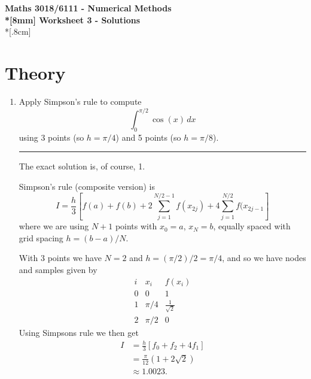 \documentclass[10pt]{article}
\begin{document}
\thispagestyle{empty}
\begin{center}
\textbf{\Large Maths 3018/6111 - Numerical Methods \\*[8mm]
Worksheet 3 - Solutions}\\*[.8cm]
\end{center}

\section*{Theory}

\begin{enumerate}
\item Apply Simpson's rule to compute
  \begin{equation*}
    \int_0^{\pi/2} \cos(x) \, dx
  \end{equation*}
  using 3 points (so $h = \pi / 4$) and 5 points (so $h = \pi / 8$).
  \begin{center}
    \rule{0.9\textwidth}{.1pt}
  \end{center}
  The exact solution is, of course, 1.

  Simpson's rule (composite version) is
  \begin{equation*}
    I = \frac{h}{3} \left[ f(a) + f(b) + 2 \sum_{j=1}^{N/2-1}
      f(x_{2j}) + 4 \sum_{j=1}^{N/2}  f(x_{2j-1} \right]
  \end{equation*}
  where we are using $N+1$ points with $x_0=a$, $x_N=b$, equally
  spaced with grid spacing $h = (b-a)/N$.

  With 3 points we have $N=2$ and $h=(\pi/2)/2=\pi/4$, and so we have
  nodes and samples given by
  \begin{equation*}
    \begin{array}{c|c|c}
      i & x_i & f(x_i) \\ \hline
      0 & 0 & 1 \\
      1 & \pi/4 & \tfrac{1}{\sqrt{2}} \\
      2 & \pi/2 & 0
    \end{array}
  \end{equation*}
  Using Simpsons rule we then get
  \begin{align*}
    I & = \frac{h}{3} \left[ f_0 + f_2 + 4 f_1 \right] \\
      & = \frac{\pi}{12} \left( 1 + 2 \sqrt{2} \right) \\
      & \approx 1.0023.
  \end{align*}


\end{enumerate}
\end{document}
